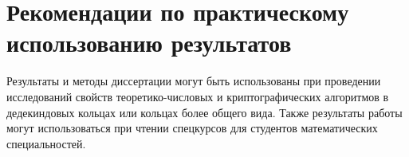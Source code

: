 \documentclass[_00_dissertation.tex]{subfiles}
\begin{document}
\section*{Рекомендации по практическому использованию результатов}

Результаты и методы диссертации могут быть использованы при проведении исследований свойств теоретико-числовых и криптографических алгоритмов в дедекиндовых кольцах или кольцах более общего вида.
Также результаты работы могут использоваться при чтении спецкурсов для студентов математических специальностей.

\onlyinsubfile{
    
}
\end{document}
